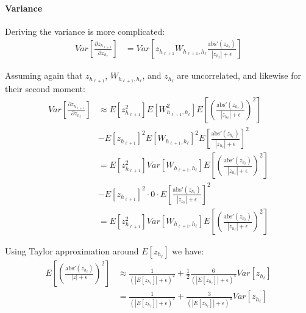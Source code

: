 \paragraph{Variance} Deriving the variance is more complicated:
\begin{equation}
\begin{aligned}
Var\left[\frac{\partial z_{h_{\ell+1}}}{\partial z_{h_\ell}}\right] &= Var\left[z_{h_{\ell+1}} W_{h_{\ell+1}, h_{\ell}} \frac{\mathrm{abs}'(z_{h_{\ell}})}{|z_{h_{\ell}}| + \epsilon}\right]
\end{aligned}
\end{equation}

Assuming again that $z_{h_{\ell+1}}$, $W_{h_{\ell+1},h_\ell}$, and $z_{h_\ell}$ are uncorrelated, and likewise for their second moment:
\begin{equation}
\begin{aligned}
Var\left[\frac{\partial z_{h_{\ell+1}}}{\partial z_{h_\ell}}\right] & \approx E[z_{h_{\ell+1}}^2] E[W_{h_{\ell+1}, h_{\ell}}^2] E\left[\left( \frac{\mathrm{abs}'(z_{h_{\ell}})}{|z_{h_{\ell}}| + \epsilon}\right)^2\right] \\
&- E[z_{h_{\ell+1}}]^2 E[W_{h_{\ell+1}, h_{\ell}}]^2 E\left[ \frac{\mathrm{abs}'(z_{h_{\ell}})}{|z_{h_{\ell}}| + \epsilon}\right]^2 \\
&= E[z_{h_{\ell+1}}^2] Var[W_{h_{\ell+1}, h_{\ell}}] E\left[\left( \frac{\mathrm{abs}'(z_{h_{\ell}})}{|z_{h_{\ell}}| + \epsilon}\right)^2\right] \\
&- E[z_{h_{\ell+1}}]^2 \cdot 0 \cdot E\left[ \frac{\mathrm{abs}'(z_{h_{\ell}})}{|z_{h_{\ell}}| + \epsilon}\right]^2 \\
&= E[z_{h_{\ell+1}}^2] Var[W_{h_{\ell+1}, h_{\ell}}] E\left[\left( \frac{\mathrm{abs}'(z_{h_{\ell}})}{|z_{h_{\ell}}| + \epsilon}\right)^2\right]
\end{aligned}
\end{equation}

Using Taylor approximation around $E[z_{h_{\ell}}]$ we have:
\begin{equation}
\begin{aligned}
E\left[\left(\frac{\mathrm{abs}'(z_{h_{\ell}})}{|z| + \epsilon}\right)^2\right] &\approx\frac{1}{\left(|E[z_{h_{\ell}}]| + \epsilon\right)^2} + \frac{1}{2} \frac{6}{\left(|E[z_{h_{\ell}}]| + \epsilon\right)^4} Var[z_{h_{\ell}}] \\
&= \frac{1}{\left(|E[z_{h_{\ell}}]| + \epsilon\right)^2} + \frac{3}{\left(|E[z_{h_{\ell}}]| + \epsilon\right)^4} Var[z_{h_{\ell}}]
\end{aligned}
\end{equation}

